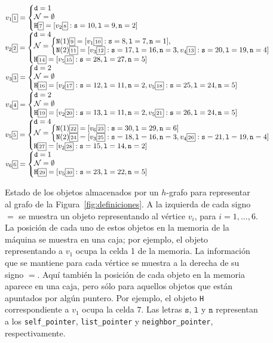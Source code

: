 \documentclass[%
    a4paper,%
    fontsize=12pt,%
    DIV=12,
    twoside,%
    openright,%
    titlepage=true,%
    headsepline,%
    toc=bibliography,%
    parskip=half,%
    cleardoublepage=empty,%
    headings=big,%
]{scrbook}
\makeatletter
\newcommand{\Code}[1]{\lstinline[basicstyle={\ttfamily}]@#1@}
\makeatother
\begin{document}
\begin{figure}[ht]
\parindent=0pt\small



$\VV{1}{1}{\mathtt{d}=1\\
           \NNNEmpty\\
           \NH{7}{\neigh{v_2}{8}{10}{9}{2}}}$\\[2mm]
$\VV{2}{2}{\mathtt{d}=4\\
           \NNN{\NN{1}{9}{\neigh{v_1}{10}{8}{7}{1}},\\
                \NN{2}{11}{\neigh{v_3}{12}{17}{16}{3}, \neigh{v_4}{13}{20}{19}{4}}}\\
           \NH{14}{\neigh{v_5}{15}{28}{27}{5}}}$\\[2mm]
$\VV{3}{3}{\mathtt{d}=2\\
           \NNNEmpty \\
           \NH{16}{\neigh{v_2}{17}{12}{11}{2}, \neigh{v_5}{18}{25}{24}{5}}}$\\[2mm]
$\VV{4}{4}{\mathtt{d}=2\\
           \NNNEmpty \\
           \NH{19}{\neigh{v_2}{20}{13}{11}{2}, \neigh{v_5}{21}{26}{24}{5}}}$\\[2mm]
$\VV{5}{5}{\mathtt{d}=4\\
           \NNN{\NN{1}{22}{\neigh{v_6}{23}{30}{29}{6}} \\
                \NN{2}{24}{\neigh{v_3}{25}{18}{16}{3}, \neigh{v_4}{26}{21}{19}{4}}}\\
                \NH{27}{\neigh{v_2}{28}{15}{14}{2}}}$\\[2mm]
$\VV{6}{6}{\mathtt{d}=1\\
           \NNNEmpty \\
           \NH{29}{\neigh{v_5}{30}{23}{22}{5}}}$%
%

\caption{Estado de los objetos almacenados por un $h$-grafo para representar al grafo de la Figura~\ref{fig:definiciones}.  A la izquierda de cada signo $=$ se muestra un objeto representando al vértice $v_i$, para $i = 1, \ldots, 6$. La posición de cada uno de estos objetos en la memoria de la máquina se muestra en una caja; por ejemplo, el objeto representando a $v_1$ ocupa la celda 1 de la memoria.  La información que se mantiene para cada vértice se muestra a la derecha de su signo $=$.  Aquí también la posición de cada objeto en la memoria aparece en una caja, pero sólo para aquellos objetos que están apuntados por algún puntero.  Por ejemplo, el objeto \Code{H} correspondiente a $v_1$ ocupa la celda $7$.  Las letras $\mathtt{s}$, $\mathtt{l}$ y $\mathtt{n}$ representan a los \Code{self_pointer}, \Code{list_pointer} y \Code{neighbor_pointer}, respectivamente.} \label{fig:h-grafo}
\end{figure}
\end{document}
